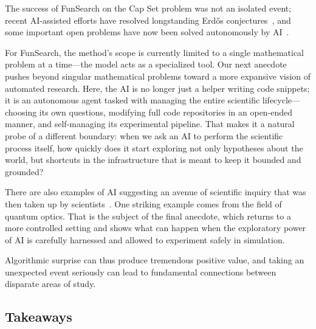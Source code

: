 \documentclass[10pt]{article}
\def\citep#1{}%
\begin{document}


The success of FunSearch on the Cap Set problem was not an isolated event; recent AI-assisted efforts have resolved longstanding Erd\H{o}s conjectures~\citep{feng2026semiautonomousmathematicsdiscoverygemini, alexeev2026primitivesetsvonmangoldt}, and some important open problems have now been solved autonomously by AI~\citep{barreto2026irrationalityrapidlyconvergingseries, sothanaphan2026resolutionerdhosproblem728, openai2026discretegeometry}.

For FunSearch, the method's scope is currently limited to a single mathematical problem at a time---the model acts as a specialized tool.
Our next anecdote pushes beyond singular mathematical problems toward a more expansive vision of automated research. 
Here, the AI is no longer just a helper writing code snippets; it is an autonomous agent tasked with managing the entire scientific lifecycle---choosing its own questions, modifying full code repositories in an open-ended manner, and self-managing its experimental pipeline.
That makes it a natural probe of a different boundary: when we ask an AI to perform the scientific process itself, how quickly does it start exploring not only hypotheses about the world, but shortcuts in the infrastructure that is meant to keep it bounded and grounded?



There are also examples of AI suggesting an avenue of scientific inquiry that was then taken up by scientists~\citep{Bao2023, Feng23Opt, Qian2023}. 
One striking example comes from the field of quantum optics.
That is the subject of the final anecdote, which returns to a more controlled setting and shows what can happen when the exploratory power of AI is carefully harnessed and allowed to experiment safely in simulation.



Algorithmic surprise can thus produce tremendous positive value, and taking an unexpected event seriously can lead to fundamental connections between disparate areas of study.

\subsection{Takeaways}
\end{document}
